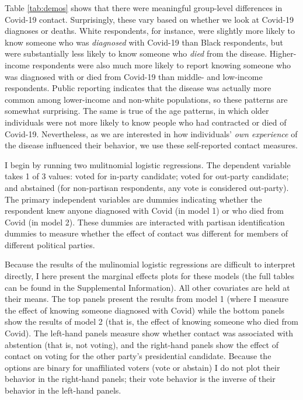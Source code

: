 \documentclass[
  12pt,
]{article}
\begin{document}
Table \ref{tab:demos} shows that there were meaningful group-level differences in Covid-19 contact. Surprisingly, these vary based on whether we look at Covid-19 diagnoses or deaths. White respondents, for instance, were slightly more likely to know someone who was \emph{diagnosed} with Covid-19 than Black respondents, but were substantially less likely to know someone who \emph{died} from the disease. Higher-income respondents were also much more likely to report knowing someone who was diagnosed with or died from Covid-19 than middle- and low-income respondents. Public reporting indicates that the disease was actually more common among lower-income and non-white populations, so these patterns are somewhat surprising. The same is true of the age patterns, in which older individuals were not more likely to know people who had contracted or died of Covid-19. Nevertheless, as we are interested in how individuals' \emph{own experience} of the disease influenced their behavior, we use these self-reported contact measures.

I begin by running two mulitnomial logistic regressions. The dependent variable takes 1 of 3 values: voted for in-party candidate; voted for out-party candidate; and abstained (for non-partisan respondents, any vote is considered out-party). The primary independent variables are dummies indicating whether the respondent knew anyone diagnosed with Covid (in model 1) or who died from Covid (in model 2). These dummies are interacted with partisan identification dummies to measure whether the effect of contact was different for members of different political parties.

Because the results of the mulinomial logistic regressions are difficult to interpret directly, I here present the marginal effects plots for these models (the full tables can be found in the Supplemental Information). All other covariates are held at their means. The top panels present the results from model 1 (where I measure the effect of knowing someone diagnosed with Covid) while the bottom panels show the results of model 2 (that is, the effect of knowing someone who died from Covid). The left-hand panels measure show whether contact was associated with abstention (that is, not voting), and the right-hand panels show the effect of contact on voting for the other party's presidential candidate. Because the options are binary for unaffiliated voters (vote or abstain) I do not plot their behavior in the right-hand panels; their vote behavior is the inverse of their behavior in the left-hand panels.
\end{document}
